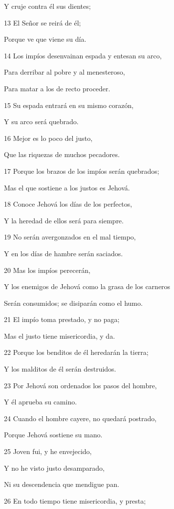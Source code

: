 \par Y cruje contra él sus dientes;
\par 13 El Señor se reirá de él;
\par Porque ve que viene su día.
\par 14 Los impíos desenvainan espada y entesan su arco,
\par Para derribar al pobre y al menesteroso,
\par Para matar a los de recto proceder.
\par 15 Su espada entrará en su mismo corazón,
\par Y su arco será quebrado.
\par 16 Mejor es lo poco del justo,
\par Que las riquezas de muchos pecadores.
\par 17 Porque los brazos de los impíos serán quebrados;
\par Mas el que sostiene a los justos es Jehová.
\par 18 Conoce Jehová los días de los perfectos,
\par Y la heredad de ellos será para siempre.
\par 19 No serán avergonzados en el mal tiempo,
\par Y en los días de hambre serán saciados.
\par 20 Mas los impíos perecerán,
\par Y los enemigos de Jehová como la grasa de los carneros
\par Serán consumidos; se disiparán como el humo.
\par 21 El impío toma prestado, y no paga;
\par Mas el justo tiene misericordia, y da.
\par 22 Porque los benditos de él heredarán la tierra;
\par Y los malditos de él serán destruidos.
\par 23 Por Jehová son ordenados los pasos del hombre,
\par Y él aprueba su camino.
\par 24 Cuando el hombre cayere, no quedará postrado,
\par Porque Jehová sostiene su mano.
\par 25 Joven fui, y he envejecido,
\par Y no he visto justo desamparado,
\par Ni su descendencia que mendigue pan.
\par 26 En todo tiempo tiene misericordia, y presta;

